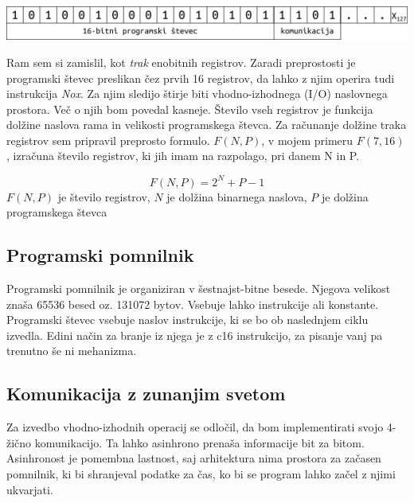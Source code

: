 \documentclass[12pt]{article}
\begin{document}
\begin{center}
  \includegraphics[width=\linewidth]{slike/predstavitev/reg.png}
\end{center}

Ram sem si zamislil, kot \textit{trak} enobitnih registrov.
Zaradi preprostosti je programski števec preslikan čez prvih 16 registrov, da lahko z njim operira tudi instrukcija \textit{Nox}.
Za njim sledijo štirje biti vhodno-izhodnega (I/O) naslovnega prostora.
Več o njih bom povedal kasneje.
Število vseh registrov je funkcija dolžine naslova rama in velikosti programskega števca.
Za računanje dolžine traka registrov sem pripravil preprosto formulo.
$F(N,P)$, v mojem primeru $F(7,16)$, izračuna število registrov, ki jih imam na razpolago, pri danem N in P.
\begin{center}
  \begin{displaymath}
    F(N,P)=2^{N}+P-1
  \end{displaymath}
  $F(N,P)$ je število registrov, $N$ je dolžina binarnega naslova, $P$ je dolžina programskega števca
\end{center}

\subsection{Programski pomnilnik}
Programski pomnilnik je organiziran v šestnajst-bitne besede.
Njegova velikost znaša 65536 besed oz. 131072 bytov.
Vsebuje lahko instrukcije ali konstante.
Programski števec vsebuje naslov instrukcije, ki se bo ob naslednjem ciklu izvedla.
Edini način za branje iz njega je z c16 instrukcijo, za pisanje vanj pa trenutno še ni mehanizma.


\subsection{Komunikacija z zunanjim svetom}
Za izvedbo vhodno-izhodnih operacij se odločil, da bom implementirati svojo 4-žično komunikacijo.
Ta lahko asinhrono prenaša informacije bit za bitom.
Asinhronost je pomembna lastnost, saj arhitektura nima prostora za začasen pomnilnik, ki bi shranjeval podatke za čas, ko bi se program lahko začel z njimi ukvarjati.
\end{document}
